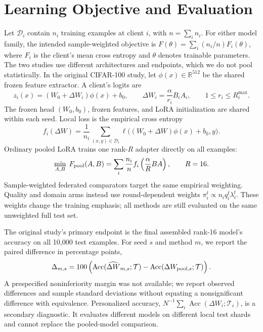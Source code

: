 \documentclass[11pt]{article}
\newcommand{\R}{\mathbb{R}}
\newcommand{\dW}{\Delta W}
\newcommand{\Acc}{\operatorname{Acc}}
\begin{document}
\section{Learning Objective and Evaluation}
Let $\mathcal D_i$ contain $n_i$ training examples at client $i$, with $n=\sum_i n_i$. For either model family, the intended sample-weighted objective is $F(\theta)=\sum_i(n_i/n)F_i(\theta)$, where $F_i$ is the client's mean cross entropy and $\theta$ denotes trainable parameters. The two studies use different architectures and endpoints, which we do not pool statistically. In the original CIFAR-100 study, let $\phi(x)\in\R^{512}$ be the shared frozen feature extractor. A client's logits are
\begin{equation}
 z_i(x)=(W_0+\dW_i)\phi(x)+b_0,
 \qquad \dW_i=\frac{\alpha}{r_i}B_iA_i,
 \qquad 1\le r_i\le R_i^{\max}.
\end{equation}
The frozen head $(W_0,b_0)$, frozen features, and LoRA initialization are shared within each seed. Local loss is the empirical cross entropy
\begin{equation}
 f_i(\dW)=\frac1{n_i}\sum_{(x,y)\in\mathcal D_i}
 \ell\big((W_0+\dW)\phi(x)+b_0,y\big).
\end{equation}
Ordinary pooled LoRA trains one rank-$R$ adapter directly on all examples:
\begin{equation}
 \min_{A,B}\;F_{\rm pool}(A,B)=\sum_i\frac{n_i}{n}
 f_i\left(\frac{\alpha}{R}BA\right),\qquad R=16.
 \label{eq:pooled-objective}
\end{equation}
Sample-weighted federated comparators target the same empirical weighting. Quality and domain arms instead use round-dependent weights $\pi_i^t\propto n_iq_i^t\lambda_i^t$. These weights change the training emphasis; all methods are still evaluated on the same unweighted full test set.

The original study's primary endpoint is the final assembled rank-16 model's accuracy on all 10,000 test examples. For seed $s$ and method $m$, we report the paired difference in percentage points,
\begin{equation}
 \Delta_{m,s}=100\left(\Acc(\widehat{\dW}_{m,s};\mathcal T)
 -\Acc(\dW_{{\rm pool},s};\mathcal T)\right).
 \label{eq:primary-endpoint}
\end{equation}
A prespecified noninferiority margin was not available; we report observed differences and sample standard deviations without equating a nonsignificant difference with equivalence. Personalized accuracy, $N^{-1}\sum_i\Acc(\dW_i;\mathcal T_i)$, is a secondary diagnostic. It evaluates different models on different local test shards and cannot replace the pooled-model comparison.
\end{document}
